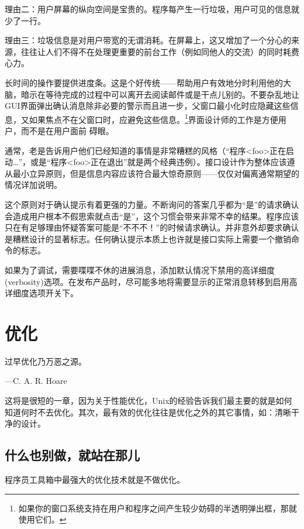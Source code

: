 \documentclass[12pt,oneside]{book}
\begin{document}
\begin{common-format}
理由二：用户屏幕的纵向空间是宝贵的。程序每产生一行垃圾，用户可见的信息就少了一行。

理由三：垃圾信息是对用户带宽的无谓消耗。在屏幕上，这又增加了一个分心的来源，往往让人们不得不在处理更重要的前台工作（例如同他人的交流）的同时耗费心力。

长时间的操作要提供进度条。这是个好传统——帮助用户有效地分时利用他的大脑，暗示在等待完成的过程中可以离开去阅读邮件或是干点儿别的。不要杂乱地让GUI界面弹出确认消息除非必要的警示而且进一步，父窗口最小化时应隐藏这些信息，又如果焦点不在父窗口时，应避免这些信息。\footnote{如果你的窗口系统支持在用户和程序之间产生较少妨碍的半透明弹出框，那就使用它们。}界面设计师的工作是方便用户，而不是在用户面前
碍眼。

通常，老是告诉用户他们已经知道的事情是非常糟糕的风格（“程序<foo>正在启动…”，或是“程序<foo>正在退出”就是两个经典违例）。接口设计作为整体应该遵从最小立异原则，但是信息内容应该符合最大惊奇原则——仅仅对偏离通常期望的情况详加说明。

这个原则对于确认提示有着更强的力量。不断询问的答案几乎都为“是”的请求确认会造成用户根本不假思索就点击“是”，这个习惯会带来非常不幸的结果。程序应该只在有足够理由怀疑答案可能是“不不不！”的时候请求确认。并非意外却要求确认是糟糕设计的显著标志。任何确认提示本质上也许就是接口实际上需要一个撤销命令的标志。

如果为了调试，需要喋喋不休的进展消息，添加默认情况下禁用的高详细度(verbosity)选项。在发布产品时，尽可能多地将需要显示的正常消息转移到启用高详细度选项开关下。



\chapter{优化}
\begin{flushright}
\begin{notecard}{15em}
过早优化乃万恶之源。

{\hfill —C. A. R. Hoare}
\end{notecard}
\end{flushright}
    
这将是很短的一章，因为关于性能优化，Unix的经验告诉我们最主要的就是如何知道何时不去优化。其次，最有效的优化往往是优化之外的其它事情，如：清晰干净的设计。

\section{什么也别做，就站在那儿}
程序员工具箱中最强大的优化技术就是不做优化。


\end{common-format}
\end{document}
